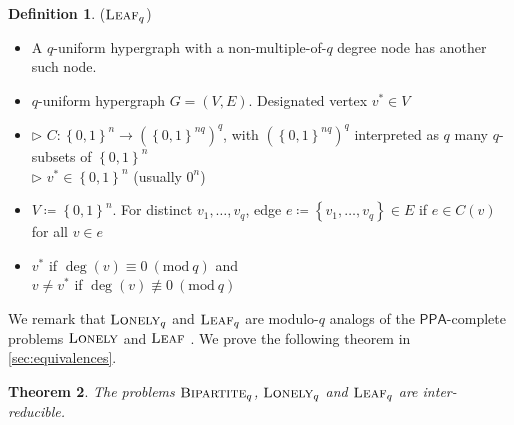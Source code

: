 \documentclass[10pt,a4paper]{article}
\newtheorem{theorem}{Theorem}
\theoremstyle{definition}
\newtheorem{definition}[theorem]{Definition}
\theoremstyle{remark}
\newcommand{\contour}[2]{#2}
\newcommand{\inparen}[1]{\left ( #1 \right )}
\renewcommand{\mod}[1]{~\inparen{\mathrm{mod}~#1}}
\def\set#1{\left\{#1\right\}}
\newcommand{\bit}{\ensuremath{\set{0,1}}}
\newcommand{\class}[1]{\ensuremath{\mathsf{#1}}\xspace}
\newcommand{\PPA}{\class{PPA}}
\newcommand{\qnum}{q}
\newcommand{\leafq}{\ensuremath\textsc{Leaf}_{\qnum}}
\newcommand{\lonelyq}{\ensuremath\textsc{Lonely}_{\qnum}}
\newcommand{\bipartiteq}{\ensuremath{\textsc{Bipartite}_\qnum}}
\newcommand{\leaf}{\ensuremath\textsc{Leaf}}
\newcommand{\lonely}{\ensuremath\textsc{Lonely}}
\begin{document}
\noindent
\begin{minipage}{\linewidth}
\begin{definition}
	\label{def:leaf} \contour{black}{($\leaf_q$)}\vspace{-5pt}
	\begin{itemize}[leftmargin=2.15cm,itemsep=4pt]
		\item[\slshape Principle:] A $q$-uniform hypergraph with a non-multiple-of-$q$ degree node has another such node.
		\item[\slshape Object:] $q$-uniform hypergraph $G = (V, E)$. Designated vertex $v^* \in V$
		\item[\slshape Inputs:] $\triangleright$ $C:\bit^n \to (\bit^{nq})^q$, with $(\bit^{nq})^q$ interpreted as $q$ many $q$-subsets of $\bit^n$\\
	$\triangleright$ $v^* \in \bit^n$ (usually $0^n$)
		\item[\slshape Encoding:] $V\coloneqq\bit^n$. For distinct $v_1, \ldots, v_q$, edge $e\coloneqq\set{v_1, \ldots, v_q}\in E$ if $e \in C(v)$ for all $v \in e$
		\item[\slshape Solutions:] $v^*$ if $\deg(v) \equiv 0 \mod{q}$ and\\
	$v \ne v^*$ if $\deg(v) \not\equiv 0 \mod{q}$
	\end{itemize}
\end{definition}
\end{minipage}\vspace{5mm}


\noindent We remark that $\lonely_q$ and $\leaf_q$ are modulo-$q$ analogs of the $\PPA$-complete problems $\lonely$ and $\leaf$ \cite{r33,r5}. We prove the following theorem in \autoref{sec:equivalences}.

\begin{theorem}\label{thm:PPAqEquivalentProblems}
The problems $\bipartiteq$, $\lonelyq$ and $\leafq$ are inter-reducible.
\end{theorem}
\end{document}
